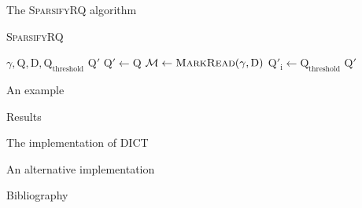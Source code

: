 \documentclass[12pt]{beamer}
\begin{document}
    \begin{frame}{The \textsc{SparsifyRQ} algorithm}
        \begin{algorithm}[H]
            \caption{\textsc{SparsifyRQ}}
            \begin{algorithmic}[1]
                \REQUIRE \(\gamma,\text{Q},\text{D},\text{Q}_{\text{threshold}}\)
                \ENSURE \(\text{Q}'\)
                \STATE \(\text{Q}' \leftarrow \text{Q}\)
                \STATE \(\mathcal{M} \leftarrow \text{\textsc{MarkRead}}(\gamma, \text{D})\)
                        \STATE \(\text{Q}'_\text{i} \leftarrow \text{Q}_{\text{threshold}}\)
                    \ENDIF
                \ENDFOR
                \RETURN \(\text{Q}'\)
            \end{algorithmic}
        \end{algorithm}
    \end{frame}

    \begin{frame}{An example}
    \end{frame}

    \begin{frame}{Results}
    \end{frame}

    \begin{frame}{The implementation of \textsc{DICT}}
    \end{frame}

    \begin{frame}{An alternative implementation}
    \end{frame}

    \begin{frame}{Bibliography}
        
    \end{frame}
\end{document}
